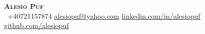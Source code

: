 \begin{center}
    \textbf{\Huge \scshape Alesio Puf} \\ \vspace{1pt}
     \ \small +40721157874 \quad
    \href{mailto:alesiopuf@yahoo.com}{ \underline{alesiopuf@yahoo.com}} \quad
    \href{https://www.linkedin.com/in/alesiopuf}{ \underline{linkedin.com/in/alesiopuf}} \quad
    \href{https://github.com/alesiopuf}{ \underline{github.com/alesiopuf}}
\end{center}